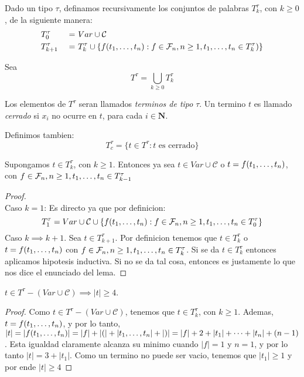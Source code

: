 Dado un tipo $\tau$, definamos recursivamente los conjuntos de palabras $T_k^\tau$, con $k \geq 0$, de la siguiente manera:
\begin{alignat*}{3}
  &T_0^\tau &\ =&\ Var \cup \mathcal{C}\\
  &T_{k+1}^\tau &\ =&\ T_{k}^\tau \cup \{f(t_{1}, \dots, t_{n}) : f \in \mathcal{F}_n, n \geq 1, t_{1}, \dots, t_{n} \in T_k^\tau)\} 
\end{alignat*}

Sea
$$
T^\tau = \bigcup_{k \geq 0}T_k^\tau
$$

Los elementos de $T^\tau$ seran llamados \emph{terminos de tipo} $\tau$. Un termino $t$ es llamado \emph{cerrado} si $x_i$ no ocurre en $t$, para cada $i \in \mathbf{N}$.

Definimos tambien:
$$
T_c^\tau = \{t \in T^\tau : t \text{ es cerrado}\}
$$

\begin{lemma}
  Supongamos $t \in T_k^\tau$, con $k \geq 1$. Entonces ya sea $t \in Var \cup \mathcal{C}$ o $t = f(t_{1}, \dots, t_{n})$, con
  $f \in \mathcal{F}_n, n \geq 1, t_{1}, \dots, t_{n} \in T_{k-1}^\tau$
\end{lemma}

\begin{proof}
  $ $\\
  Caso $k=1$: Es directo ya que por definicion:
  $$
  T_1^\tau=Var\cup\mathcal{C}\cup\{f(t_{1}, \dots, t_{n}):f\in\mathcal{F}_n, n\geq1,t_{1}, \dots, t_{n}\in T_0^\tau\}
  $$
  Caso $k\implies k+1$. Sea $t\in T^\tau_{k+1}$. Por definicion tenemos que $t\in T^\tau_k$ o
  $t = f(t_{1}, \dots, t_{n})$ con $f\in\mathcal{F}_n,n\geq1,t_{1}, \dots, t_{n}\in T_k^\tau$. Si se da $t\in T^\tau_k$ entonces 
  aplicamos hipotesis inductiva. Si no se da tal cosa, entonces es justamente lo que nos dice el enunciado del lema.
\end{proof}

\begin{remark}
  $t \in T^\tau - (Var \cup \mathcal{C}) \implies |t| \geq 4$.
\end{remark}
\begin{proof}
  Como $t \in T^\tau - (Var \cup \mathcal{C})$, tenemos que $t \in T^\tau_{k}$, con $k \geq 1$. Ademas, $t = f(t_{1}, \dots, t_{n})$, y por lo tanto,
  $|t| = |f(t_{1}, \dots, t_{n})| = |f| + |(| + |t_{1}, \dots, t_{n}| + |)| = |f| + 2 + |t_1| + \dots + |t_n| + (n - 1)$.
  Esta igualdad claramente alcanza su minimo cuando $|f| = 1$ y $n = 1$, y por lo tanto $|t| = 3 + |t_1|$. Como un termino no puede ser vacio, tenemos que $|t_1| \geq 1$ y por ende $|t| \geq 4$
\end{proof}


